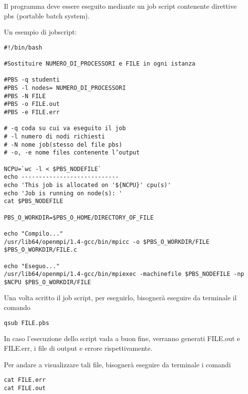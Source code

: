 Il programma deve essere eseguito mediante un job script contenente direttive pbs (portable batch system).

Un esempio di jobscript:
\begin{lstlisting}
#!/bin/bash

#Sostituire NUMERO_DI_PROCESSORI e FILE in ogni istanza

#PBS -q studenti
#PBS -l nodes= NUMERO_DI_PROCESSORI
#PBS -N FILE
#PBS -o FILE.out
#PBS -e FILE.err

# -q coda su cui va eseguito il job
# -l numero di nodi richiesti
# -N nome job(stesso del file pbs)
# -o, -e nome files contenente l’output

NCPU=`wc -l < $PBS_NODEFILE`
echo ----------------------------
echo 'This job is allocated on '${NCPU}' cpu(s)'
echo 'Job is running on node(s): '
cat $PBS_NODEFILE

PBS_O_WORKDIR=$PBS_O_HOME/DIRECTORY_OF_FILE

echo "Compilo..."
/usr/lib64/openmpi/1.4-gcc/bin/mpicc -o $PBS_O_WORKDIR/FILE $PBS_O_WORKDIR/FILE.c

echo "Eseguo..."
/usr/lib64/openmpi/1.4-gcc/bin/mpiexec -machinefile $PBS_NODEFILE -np $NCPU $PBS_O_WORKDIR/FILE
\end{lstlisting}

Una volta scritto il job script, per eseguirlo, bisognerà eseguire da terminale il comando 
\begin{lstlisting}
qsub FILE.pbs
\end{lstlisting}

In caso l'esecuzione dello script vada a buon fine, verranno generati FILE.out e FILE.err, i file di output e errore rispettivamente.

Per andare a visualizzare tali file, bisognerà eseguire da terminale i comandi
\begin{lstlisting}
cat FILE.err
cat FILE.out
\end{lstlisting}
